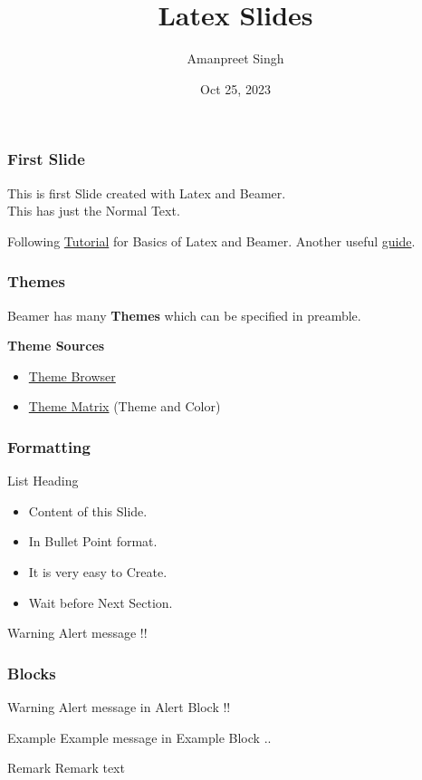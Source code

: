 \documentclass[12pt]{beamer}
\title{Latex Slides}
\author{Amanpreet Singh}
\date[Conf 2023] %
{Oct 25, 2023}
\institute[DPS] %
{
  \inst{1}
  Faculty of Physics\\
  Dashmesh Public School
  \and
  \inst{2}
  Faculty of Chemistry\\
  BNMIT
}
\begin{document}
\maketitle

\begin{frame}
\frametitle{First Slide}
This is first Slide created with Latex and Beamer.\\
This has just the Normal Text.

Following \href{https://latex-beamer.com/tutorials/beamer-themes/}{Tutorial} for Basics of Latex and Beamer.
Another useful \href{https://www.overleaf.com/learn/latex/Beamer}{guide}.
\end{frame}

\begin{frame}
\frametitle{Themes}
Beamer has many \textbf{Themes} which can be specified in preamble.

\textbf{Theme Sources}
\begin{itemize}
    \item \href{https://deic.uab.cat/~iblanes/beamer_gallery/index_by_theme.html}{Theme Browser}
    \item \href{https://hartwork.org/beamer-theme-matrix/}{Theme Matrix} (Theme and Color)
\end{itemize}

\end{frame}

\begin{frame}
    \frametitle{Formatting}
    List Heading
    \begin{itemize}
        \item Content of this Slide.
        \item In Bullet Point format.
        \item It is very easy to Create.
        \item Wait before Next Section.\pause
    \end{itemize}

    \begin{alert}{Warning}
        Alert message !!
    \end{alert}

\end{frame}

\begin{frame}
    \frametitle{Blocks}
    
    \begin{alertblock}{Warning}
        Alert message in Alert Block !!
    \end{alertblock}
    
    \begin{exampleblock}{Example}
        Example message in Example Block ..
    \end{exampleblock}
    
    \begin{block}{Remark}
        Remark text
    \end{block}

\end{frame}
\end{document}
